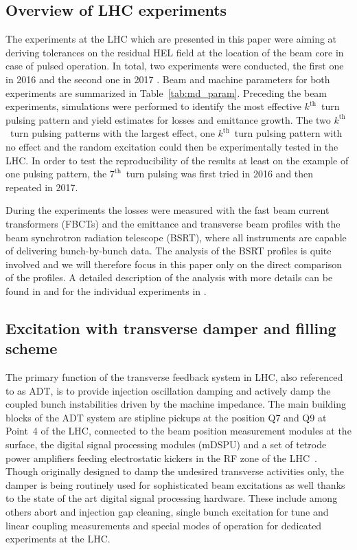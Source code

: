 \documentclass[%
 reprint,
 amsmath,amssymb,
 aps,
prstab,
]{revtex4-1}
\begin{document}
\subsection{Overview of LHC experiments\label{sec:exp_sum}}
The experiments at the LHC which are presented in this paper were aiming at deriving tolerances on the residual HEL field at the location of the beam core in case of pulsed operation. In total, two experiments were conducted, the first one in 2016 \cite{resexmd2016} and the second one in 2017 \cite{resexmd2017}. Beam and machine parameters for both experiments are summarized in Table~\ref{tab:md_param}. Preceding the beam experiments, simulations were performed to identify the most effective $k^{\mathrm{th}}$~turn pulsing pattern and yield estimates for losses and emittance growth. The two $k^{\mathrm{th}}$~turn pulsing patterns with the largest effect, one $k^{\mathrm{th}}$~turn pulsing pattern with no effect and the random excitation could then be experimentally tested in the LHC. In order to test the reproducibility of the results at least on the example of one pulsing pattern, the $7^{\mathrm{th}}$~turn pulsing was first tried in 2016 and then repeated in 2017.

During the experiments the losses were measured with the fast beam current transformers (FBCTs) and the emittance and transverse beam profiles with the beam synchrotron radiation telescope (BSRT), where all instruments are capable of delivering bunch-by-bunch data. The analysis of the BSRT profiles is quite involved and we will therefore focus in this paper only on the direct comparison of the profiles. A detailed description of the analysis with more details can be found in \cite{bsrtprofinj} and for the individual experiments in \cite{resexmd2016,resexmd2017}.

\subsection{Excitation with transverse damper and filling scheme\label{sec:adt}}
The primary function of the transverse feedback system in LHC, also referenced to as ADT, is to provide injection oscillation damping and actively damp the coupled bunch instabilities driven by the machine impedance. The main building blocks of the ADT system are stipline pickups at the position Q7 and Q9 at Point~4 of the LHC, connected to the beam position measurement modules at the surface, the digital signal processing modules (mDSPU) and a set of tetrode power amplifiers feeding electrostatic kickers in the RF zone of the LHC~\cite{adt_sum_2008,adt_sum_2011}. Though originally designed to damp the undesired transverse activities only, the damper is being routinely used for sophisticated beam excitations as well thanks to the state of the art digital signal processing hardware. These include among others abort and injection gap cleaning, single bunch excitation for tune and linear coupling measurements and special modes of operation for dedicated experiments at the LHC.
\end{document}
